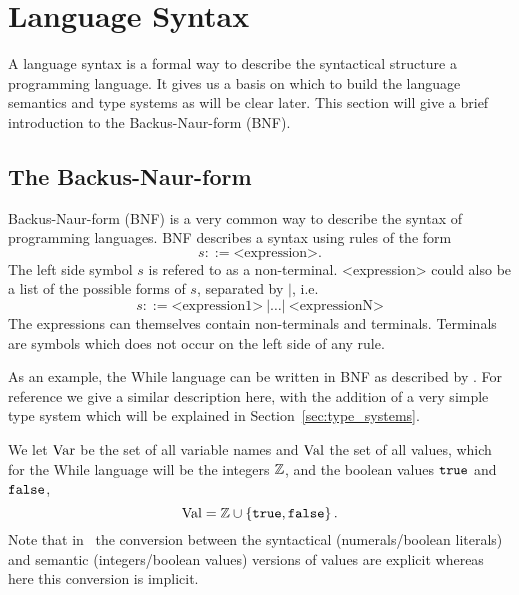 \section{Language Syntax} \label{sec:language_syntax}

A language syntax is a formal way to describe the syntactical structure a
programming language. It gives us a basis on which to build the language
semantics and type systems as will be clear later. This section will give a
brief introduction to the Backus-Naur-form (BNF).

\subsection{The Backus-Naur-form} \label{sub:the_backus_naur_form} 

Backus-Naur-form (BNF) is a very common way to describe the syntax of
programming languages. BNF describes a syntax using rules of the form
\begin{equation*}
  s ::= \text{<expression>}.
\end{equation*}
The left side symbol $s$ is refered to as a non-terminal. <expression> could
also be a list of the
possible forms of $s$, separated by $|$, i.e. 
\begin{equation*}
  s ::= \text{<expression1>} \: | \dots | \: \text{<expressionN>}
\end{equation*}
The expressions can themselves contain non-terminals and terminals.
Terminals are symbols which does not occur on the left side of any rule.

As an example, the While language can be written in BNF as described
by \textcite{nielson2007semantics}. For reference we give a similar description
here, with the addition of a very simple type system which will be explained in
Section~\ref{sec:type_systems}.

We let $\mbox{$\mathrm{Var}$}$ be the set of all variable names and $\mbox{$\mathrm{Val}$}$ the
set of all values, which for the While language will be the integers $\mathbb{Z}$,
and the boolean values $\mbox{\texttt{true}}$ and $\mbox{\texttt{false}}$,
\begin{equation*}
  \mbox{$\mathrm{Val}$} = \mathbb{Z} \cup \left\{ \mbox{\texttt{true}}, \mbox{\texttt{false}} \right\}.
\end{equation*}
Note that in~\parencite{nielson2007semantics} 
the conversion between the syntactical (numerals\slash boolean literals) and semantic
(integers\slash boolean values) versions of values are explicit whereas here 
this conversion is implicit.

